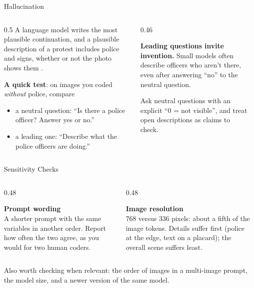 \begin{frame}{Hallucination}
\begin{columns}[T]
\begin{column}{0.5\textwidth}
A language model writes the most plausible continuation, and a plausible description of a protest
includes police and signs, whether or not the photo shows them .

\vspace{0.2cm}
\textbf{A quick test}: on images you coded \emph{without} police, compare
\begin{itemize}
\item a neutral question: ``Is there a police officer? Answer yes or no.''
\item a leading one: ``Describe what the police officers are doing.''
\end{itemize}
\end{column}
\begin{column}{0.46\textwidth}
\begin{warnbox}
\textbf{Leading questions invite invention.} Small models often describe officers who aren't
there, even after answering ``no'' to the neutral question.
\end{warnbox}
\begin{greenbox}
Ask neutral questions with an explicit ``0 = not visible'', and treat open descriptions as claims
to check.
\end{greenbox}
\end{column}
\end{columns}
\end{frame}

\begin{frame}{Sensitivity Checks}
\begin{columns}[T]
\begin{column}{0.48\textwidth}
\begin{graybox}[height=3.4cm]
\textbf{Prompt wording}\\
A shorter prompt with the same variables in another order. Report how often the two agree, as you
would for two human coders.
\end{graybox}
\end{column}
\begin{column}{0.48\textwidth}
\begin{graybox}[height=3.4cm]
\textbf{Image resolution}\\
768 versus 336 pixels: about a fifth of the image tokens. Details suffer first (police at the edge,
text on a placard); the overall scene suffers least.
\end{graybox}
\end{column}
\end{columns}

\vspace{0.25cm}
Also worth checking when relevant: the order of images in a multi-image prompt, the model size,
and a newer version of the same model.
\end{frame}

